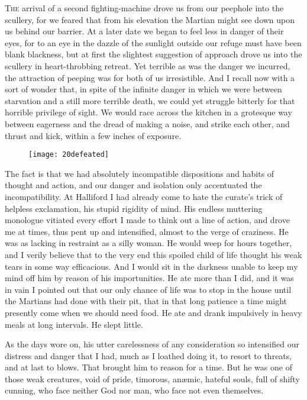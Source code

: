 

\lettrine[lines=4]{T}{he} arrival of a second fighting-machine drove us from our peephole into the scullery, for we feared that from his elevation the Martian might see down upon us behind our barrier. At a later date we began to feel less in danger of their eyes, for to an eye in the dazzle of the sunlight outside our refuge must have been blank blackness, but at first the slightest suggestion of approach drove us into the scullery in heart-throbbing retreat. Yet terrible as was the danger we incurred, the attraction of peeping was for both of us irresistible. And I recall now with a sort of wonder that, in spite of the infinite danger in which we were between starvation and a still more terrible death, we could yet struggle bitterly for that horrible privilege of sight. We would race across the kitchen in a grotesque way between eagerness and the dread of making a noise, and strike each other, and thrust and kick, within a few inches of exposure.

\begin{figure}[tb]
\centering
\texttt{[image: 20defeated]}
\end{figure}

The fact is that we had absolutely incompatible dispositions and habits of thought and action, and our danger and isolation only accentuated the incompatibility. At Halliford I had already come to hate the curate's trick of helpless exclamation, his stupid rigidity of mind. His endless muttering monologue vitiated every effort I made to think out a line of action, and drove me at times, thus pent up and intensified, almost to the verge of craziness. He was as lacking in restraint as a silly woman. He would weep for hours together, and I verily believe that to the very end this spoiled child of life thought his weak tears in some way efficacious. And I would sit in the darkness unable to keep my mind off him by reason of his importunities. He ate more than I did, and it was in vain I pointed out that our only chance of life was to stop in the house until the Martians had done with their pit, that in that long patience a time might presently come when we should need food. He ate and drank impulsively in heavy meals at long intervals. He slept little.

As the days wore on, his utter carelessness of any consideration so intensified our distress and danger that I had, much as I loathed doing it, to resort to threats, and at last to blows. That brought him to reason for a time. But he was one of those weak creatures, void of pride, timorous, anæmic, hateful souls, full of shifty cunning, who face neither God nor man, who face not even themselves.

